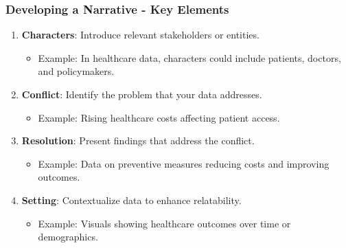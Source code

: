 \documentclass[aspectratio=169]{beamer}
\begin{document}
\begin{frame}[fragile]
  \frametitle{Developing a Narrative - Key Elements}
  \begin{enumerate}
    \item \textbf{Characters}: Introduce relevant stakeholders or entities.
      \begin{itemize}
        \item Example: In healthcare data, characters could include patients, doctors, and policymakers.
      \end{itemize}
      
    \item \textbf{Conflict}: Identify the problem that your data addresses.
      \begin{itemize}
        \item Example: Rising healthcare costs affecting patient access.
      \end{itemize}

    \item \textbf{Resolution}: Present findings that address the conflict.
      \begin{itemize}
        \item Example: Data on preventive measures reducing costs and improving outcomes.
      \end{itemize}

    \item \textbf{Setting}: Contextualize data to enhance relatability.
      \begin{itemize}
        \item Example: Visuals showing healthcare outcomes over time or demographics.
      \end{itemize}
  \end{enumerate}
\end{frame}
\end{document}
